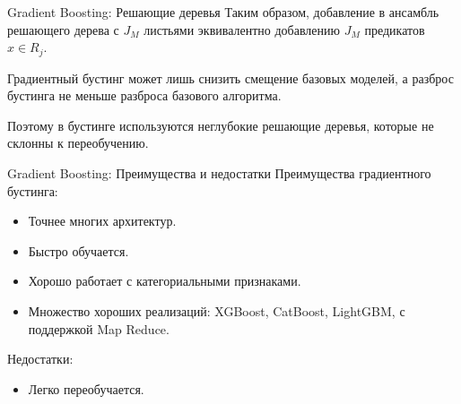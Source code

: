 \documentclass[notheorems, handout]{beamer}
\begin{document}
\begin{frame}{Gradient Boosting: Решающие деревья}
Таким образом, добавление в ансамбль решающего дерева с $J_M$ листьями эквивалентно добавлению $J_M$ предикатов $x\in R_j$.
\par\smallskip
Градиентный бустинг может лишь снизить смещение базовых моделей, а разброс бустинга не меньше разброса базового алгоритма.
\par\smallskip
Поэтому в бустинге используются неглубокие решающие деревья, которые не склонны к переобучению.
\end{frame}

\begin{frame}{Gradient Boosting: Преимущества и недостатки }
Преимущества градиентного бустинга:
\begin{itemize}
	\item Точнее многих архитектур.
	\item Быстро обучается.
	\item Хорошо работает с категориальными признаками.
	\item Множество хороших реализаций: XGBoost, CatBoost, LightGBM, с поддержкой Map Reduce.
\end{itemize}
\par\smallskip
Недостатки:
\begin{itemize}
	\item Легко переобучается.
\end{itemize}
\end{frame}
\end{document}
